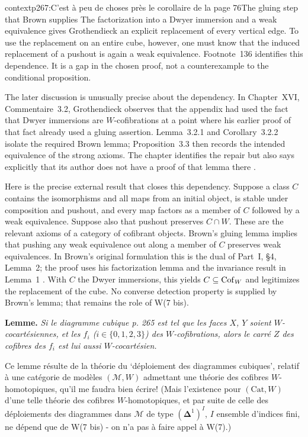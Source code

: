 \begin{dcomment}{context}{p267:C'est à peu de choses près le corollaire de la page 76}{The gluing step that Brown supplies}
The factorization into a Dwyer immersion and a weak equivalence gives Grothendieck an explicit replacement of every vertical edge. To use the replacement on an entire cube, however, one must know that the induced replacement of a pushout is again a weak equivalence. Footnote~136 identifies this dependence. It is a gap in the chosen proof, not a counterexample to the conditional proposition.

The later discussion is unusually precise about the dependency. In Chapter~XVI, Commentaire~3.2, Grothendieck observes that the appendix had used the fact that Dwyer immersions are $W$-cofibrations at a point where his earlier proof of that fact already used a gluing assertion. Lemma~3.2.1 and Corollary~3.2.2 isolate the required Brown lemma; Proposition~3.3 then records the intended equivalence of the strong axioms. The chapter identifies the repair but also says explicitly that its author does not have a proof of that lemma there \citep[\S3, ms.~pp.~18--23]{GrothendieckDerivateursXVI}.

Here is the precise external result that closes this dependency. Suppose a class $C$ contains the isomorphisms and all maps from an initial object, is stable under composition and pushout, and every map factors as a member of $C$ followed by a weak equivalence. Suppose also that pushout preserves $C\cap W$. These are the relevant axioms of a category of cofibrant objects. Brown's gluing lemma implies that pushing any weak equivalence out along a member of $C$ preserves weak equivalences. In Brown's original formulation this is the dual of Part~I, \S4, Lemma~2; the proof uses his factorization lemma and the invariance result in Lemma~1 \citep[pp.~428--429]{Brown1973}. With $C$ the Dwyer immersions, this yields $C\subseteq\mathrm{Cof}_W$ and legitimizes the replacement of the cube. No converse detection property is supplied by Brown's lemma; that remains the role of W(7 bis).
\end{dcomment}


\textbf{Lemme.} \textit{Si le diagramme cubique p. 265 est tel que les faces $X$, $Y$ soient $W$-cocartésiennes, et les $f_i$ ($i \in \{0,1,2,3\}$) des $W$-cofibrations, alors le carré $Z$ des cofibres des $f_i$ est lui aussi $W$-cocartésien.}

Ce lemme résulte de la théorie du `déploiement des diagrammes cubiques', relatif à une catégorie de modèles $(\mathcal{M}, W)$ admettant une théorie des cofibres $W$-homotopiques, qu'il me faudra bien écrire! (Mais l'existence pour $(\mathrm{Cat}, W)$ d'une telle théorie des cofibres $W$-homotopiques, et par suite de celle des déploiements des diagrammes dans $\mathcal{M}$ de type $(\boldsymbol{\Delta}^1)^I$, $I$ ensemble d'indices fini, ne dépend que de W(7 bis) - on n'a pas à faire appel à W(7).)

